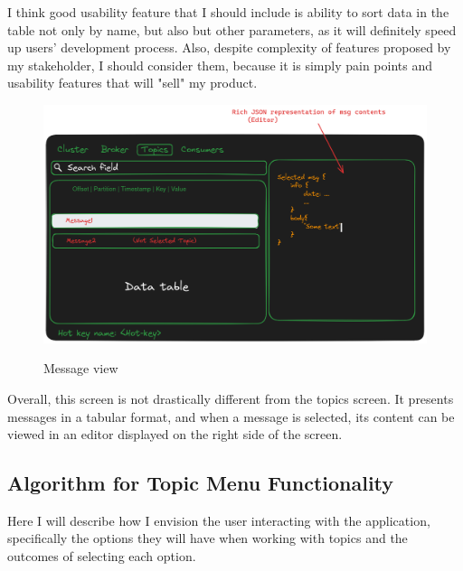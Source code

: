 \documentclass[10pt , a4paper]{report}
\begin{document}
I think good usability feature that I should include is ability to sort data in the table not only by name, but also but other parameters, as it will definitely speed up users' development process. Also, despite complexity of features proposed by my stakeholder, I should consider them, because it is simply pain points and usability features that will "sell" my product.

\begin{figure}[htbp]
    \centering
    \includegraphics[width=.8\linewidth]{imgs/MessageView.png}
    \label{fig:message_view}
    \caption{Message view}
\end{figure}

Overall, this screen is not drastically different from the topics screen. It presents messages in a tabular format, and when a message is selected, its content can be viewed in an editor displayed on the right side of the screen.

\subsection{Algorithm for Topic Menu Functionality}

Here I will describe how I envision the user interacting with the application, specifically the options they will have when working with topics and the outcomes of selecting each option.
\end{document}
